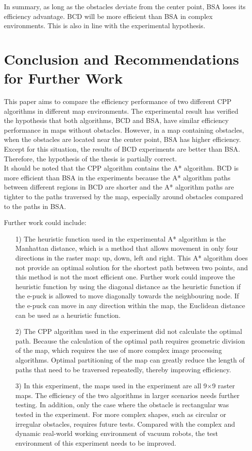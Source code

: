 \documentclass[conference]{IEEEtran}
\begin{document}
In summary, as long as the obstacles deviate from the center point, BSA loses its efficiency advantage. BCD will be more efficient than BSA in complex environments. This is also in line with the experimental hypothesis. 

\section{Conclusion and Recommendations for Further Work}

This paper aims to compare the efficiency performance of two different CPP algorithms in different map environments. The experimental result has verified the hypothesis that both algorithms, BCD and BSA, have similar efficiency performance in maps without obstacles. However, in a map containing obstacles, when the obstacles are located near the center point, BSA has higher efficiency. Except for this situation, the results of BCD experiments are better than BSA. Therefore, the hypothesis of the thesis is partially correct.\\
It should be noted that the CPP algorithm contains the A* algorithm. BCD is more efficient than BSA in the experiments because the A* algorithm paths between different regions in BCD are shorter and the A* algorithm paths are tighter to the paths traversed by the map, especially around obstacles compared to the paths in BSA.

Further work could include:
\begin{itemize}
  \item [1)]
    The heuristic function used in the experimental A* algorithm is the Manhattan distance, which is a method that allows movement in only four directions in the raster map: up, down, left and right. This A* algorithm does not provide an optimal solution for the shortest path between two points, and this method is not the most efficient one. Further work could improve the heuristic function by using the diagonal distance as the heuristic function if the e-puck is allowed to move diagonally towards the neighbouring node. If the e-puck can move in any direction within the map, the Euclidean distance can be used as a heuristic function.
  \item [2)]
    The CPP algorithm used in the experiment did not calculate the optimal path. Because the calculation of the optimal path requires geometric division of the map, which requires the use of more complex image processing algorithms. Optimal partitioning of the map can greatly reduce the length of paths that need to be traversed repeatedly, thereby improving efficiency.
  \item [3)]
    In this experiment, the maps used in the experiment are all 9$\times$9 raster maps. The efficiency of the two algorithms in larger scenarios needs further testing. In addition, only the case where the obstacle is rectangular was tested in the experiment. For more complex shapes, such as circular or irregular obstacles, requires future tests. Compared with the complex and dynamic real-world working environment of vacuum robots, the test environment of this experiment needs to be improved.
    
\end{itemize}



 

\end{document}
